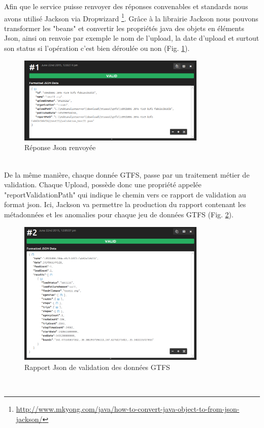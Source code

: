 \begin{itemize}
Afin que le service puisse renvoyer des réponses convenables et standards nous avons utilisé Jackson via Dropwizard \footnote{\url{http://www.mkyong.com/java/how-to-convert-java-object-to-from-json-jackson/}}. Grâce à la librairie Jackson nous pouvons transformer les "beans" et convertir les propriétés java des objets en éléments Json, ainsi on renvoie par exemple le nom de l'upload, la date d'upload et surtout son status si l'opération c'est bien déroulée ou non (Fig. \ref{fig:Json1}).
\\
\begin{figure}[h]
	\centering
		\includegraphics[width=0.8\textwidth]{images/JsonFormatter_serialization.PNG}
	\caption{Réponse Json renvoyée}
	\label{fig:Json1}
\end{figure}\\

De la même manière, chaque donnée GTFS, passe par un traitement métier de validation. Chaque Upload, possède donc une propriété appelée "reportValidationPath" qui indique le chemin vers ce rapport de validation au format json. Ici, Jackson va permettre la production du rapport contenant les métadonnées et les anomalies pour chaque jeu de données GTFS (Fig. \ref{fig:Json2}).
\\
\begin{figure}[h]
	\centering
		\includegraphics[width=0.8\textwidth]{images/JsonFormatter_serialization_Validation.PNG}
	\caption{Rapport Json de validation des données GTFS}
	\label{fig:Json2}
\end{figure}\\



\end{itemize}
